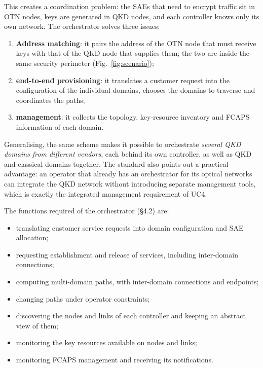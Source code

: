 This creates a coordination problem: the SAEs that need to encrypt traffic
sit in OTN nodes, keys are generated in QKD nodes, and each controller knows
only its own network. The orchestrator solves three issues:

\begin{enumerate}
  \item \textbf{Address matching}: it pairs the address of the OTN node that
        must receive keys with that of the QKD node that supplies them; the
        two are inside the same security perimeter (Fig.~\ref{fig:scenario});
  \item \textbf{end-to-end provisioning}: it translates a customer request
        into the configuration of the individual domains, chooses the domains
        to traverse and coordinates the paths;
  \item \textbf{management}: it collects the topology, key-resource
        inventory and FCAPS information of each domain.
\end{enumerate}

Generalising, the same scheme makes it possible to orchestrate
\emph{several QKD domains from different vendors}, each behind its own
controller, as well as QKD and classical domains together. The standard
also points out a practical advantage: an operator that already has an
orchestrator for its optical networks can integrate the QKD network without
introducing separate management tools, which is exactly the integrated
management requirement of UC4.

The functions required of the orchestrator (§4.2) are:
\begin{itemize}
  \item translating customer service requests into domain configuration and
        SAE allocation;
  \item requesting establishment and release of services, including
        inter-domain connections;
  \item computing multi-domain paths, with inter-domain connections and
        endpoints;
  \item changing paths under operator constraints;
  \item discovering the nodes and links of each controller and keeping an
        abstract view of them;
  \item monitoring the key resources available on nodes and links;
  \item monitoring FCAPS management and receiving its notifications.
\end{itemize}

